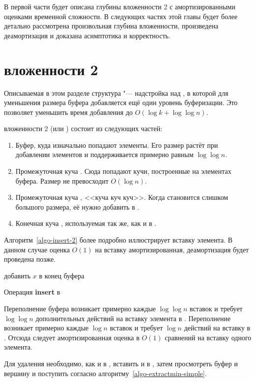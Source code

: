 В первой части будет описана \CH глубины вложенности 2 с амортизированными оценками
временной сложности. В следующих частях этой главы будет более детально рассмотрена
произвольная глубина вложенности, произведена деамортизация и доказана асимптотика
и корректность.

\section{\CH вложенности 2}
Описываемая в этом разделе структура "--- надстройка над \SCH, в которой
для уменьшения размера буфера добавляется ещё один уровень буферизации.
Это позволяет уменьшить время добавления до $O(\log k + \log \log n)$.

\CH вложенности 2 (или \CH[2]) состоит из следующих частей:

\begin{enumerate}
\item Буфер, куда изначально попадают элементы. Его размер растёт при добавлении
    элементов и поддерживается примерно равным $\log \log n$.
\item Промежуточная куча \MH[2]. Сюда попадают кучи, построенные на элементах
    буфера. Размер \MH[2] не превосходит $O(\log n)$.
\item Промежуточная куча \MH[1], <<куча куч куч>>. Когда \MH[2] становится
    слишком большого размера, её нужно добавить в \MH[1].
\item Конечная куча \HH, используемая так же, как и в \SCH.
\end{enumerate}

Алгоритм~\ref{algo-insert-2} более подробно иллюстрирует вставку элемента.
В данном случае оценка $O(1)$ на вставку амортизированная, деамортизация будет
проведена позже.

\begin{algorithm}[h]
 добавить $x$ в конец буфера\;
 \caption{Операция \textbf{insert} в \CH[2]}
 \label{algo-insert-2}
\end{algorithm}

Переполнение буфера возникает примерно каждые $\log\log n$ вставок
и требует $\log \log n$ дополнительных действий на вставку элемента
в \MH[2]. Переполнение
\MH[2] возникает примерно каждые $\log n$ вставок и требует $\log n$
действий на вставку в \MH[1]. Отсюда следует амортизированная оценка
в $O(1)$ сравнений на вставку одного элемента.

Для удаления необходимо, как и в \SCH, вставить \MH[1] и \MH[2] в \HH,
затем просмотреть буфер и вершину \HH и поступить согласно
алгоритму~\ref{algo-extractmin-simple}.
